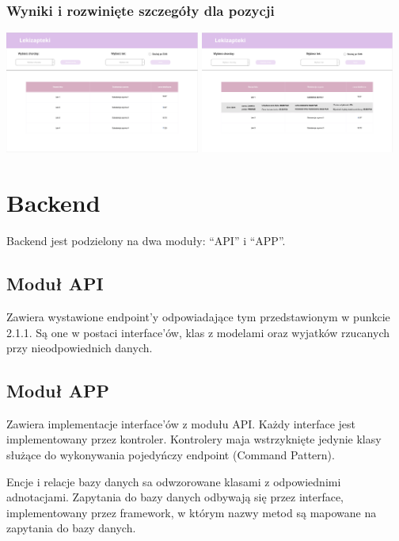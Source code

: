 \documentclass{article}
\begin{document}
      \subsubsection{Wyniki i rozwinięte szczegóły dla pozycji}
      \includegraphics[width=6.4cm, height=4cm]{lekizapteki-leki-identyczne}
      \includegraphics[width=6.4cm, height=4cm]{lekizapteki-leki-identyczne-rozwiniete}

  \section{Backend}
  Backend jest podzielony na dwa moduły: ``API'' i ``APP''.

    \subsection{Moduł API}
    Zawiera wystawione endpoint'y odpowiadające tym przedstawionym w punkcie 2.1.1.
    Są one w postaci interface'ów, klas z modelami oraz wyjatków rzucanych przy nieodpowiednich danych.

    \subsection{Moduł APP}
    Zawiera implementacje interface'ów z modułu API.
    Każdy interface jest implementowany przez kontroler.
    Kontrolery maja wstrzyknięte jedynie klasy służące do wykonywania pojedyńczy endpoint (Command Pattern).

    Encje i relacje bazy danych sa odwzorowane klasami z odpowiednimi adnotacjami.
    Zapytania do bazy danych odbywają się przez interface, implementowany przez framework,
    w którym nazwy metod są mapowane na zapytania do bazy danych.
\end{document}

